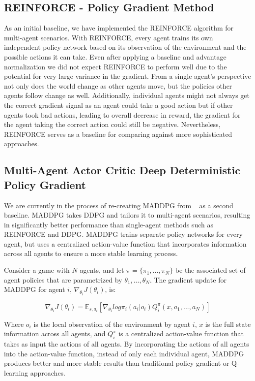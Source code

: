 \documentclass{article}
\begin{document}
\subsection{REINFORCE - Policy Gradient Method}
As an initial baseline, we have implemented the REINFORCE algorithm for multi-agent scenarios. With REINFORCE, every agent trains its own independent policy network based on its observation of the environment and the possible actions it can take. Even after applying a baseline and advantage normalization we did not expect REINFORCE to perform well due to the potential for very large variance in the gradient. From a single agent's perspective not only does the world change as other agents move, but the policies other agents follow change as well. Additionally, individual agents might not always get the correct gradient signal as an agent could take a good action but if other agents took bad actions, leading to overall decrease in reward, the gradient for the agent taking the correct action could still be negative. Nevertheless, REINFORCE serves as a baseline for comparing against more sophisticated approaches.

\subsection{Multi-Agent Actor Critic Deep Deterministic Policy Gradient}
We are currently in the process of re-creating MADDPG from ~\cite{maddpg} as a second baseline. MADDPG takes DDPG and tailors it to multi-agent scenarios, resulting in significantly better performance than single-agent methods such as REINFORCE and DDPG. MADDPG trains separate policy networks for every agent, but uses a centralized action-value function that incorporates information across all agents to ensure a more stable learning process. 

Consider a game with $N$ agents, and let $\pi = \{\pi_1, ..., \pi_N\}$ be the associated set of agent policies that are parametrized by $\theta_1, ..., \theta_N$. The gradient update for MADDPG for agent $i$, $\nabla_{\theta_i} J(\theta_i)$, is:

$$\nabla_{\theta_i}J(\theta_i) = \mathbb{E}_{s, a_i}[\nabla_{\theta_i}log \pi_i(a_i|o_i)Q^{\pi}_i(x, a_1, ..., a_N)]$$

Where $o_i$ is the local observation of the environment by agent $i$, $x$ is the full state information across all agents, and $Q^{\pi}_i$ is a centralized action-value function that takes as input the actions of all agents. By incorporating the actions of all agents into the action-value function, instead of only each individual agent, MADDPG produces better and more stable results than traditional policy gradient or Q-learning approaches.
\end{document}
